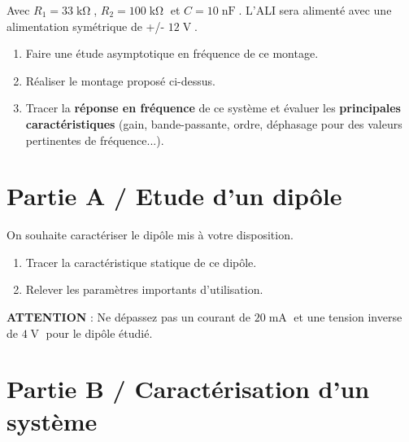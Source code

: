 \documentclass[a4paper]{book}%
\begin{document}
\bigskip

Avec $R_1 = 33\operatorname{k\Omega}$, $R_2 = 100\operatorname{k\Omega}$ et $C = 10\operatorname{nF}$. L'ALI sera alimenté avec une alimentation symétrique de +/- $12\operatorname{V}$.

\bigskip
	
	\begin{enumerate}
		\item Faire une étude asymptotique en fréquence de ce montage.
		\item Réaliser le montage proposé ci-dessus.
		\item Tracer la \textbf{réponse en fréquence} de ce système et évaluer les \textbf{principales caractéristiques} (gain, bande-passante, ordre, déphasage pour des valeurs pertinentes de fréquence...).
	\end{enumerate}	
	
	
	


\cleardoublepage

	 

	\noindent \hrulefill
	
	\section*{Partie A / Etude d'un dipôle}
	
	On souhaite caractériser le dipôle mis à votre disposition. 

	\begin{enumerate}
		\item Tracer la caractéristique statique de ce dipôle.
		\item Relever les paramètres importants d'utilisation.
	\end{enumerate}

	\noindent \hrulefill

\textbf{ATTENTION} : Ne dépassez pas un courant de $20\operatorname{mA}$ et une tension inverse de $4\operatorname{V}$ pour le dipôle étudié.

	\noindent \hrulefill
	
	\section*{Partie B / Caractérisation d'un système}
	
\end{document}
